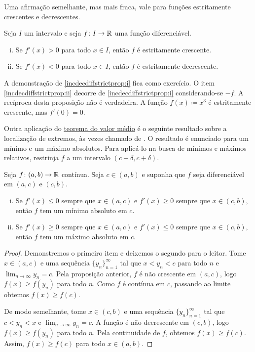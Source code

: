 Uma afirmação semelhante, mas mais fraca, vale para funções estritamente
crescentes e decrescentes.

\begin{prop} \label{incdecdiffstrictprop}
Seja $I$ um intervalo e
seja $f \colon I \to {\mathbb{R}}$ uma função diferenciável.
\begin{enumerate}[(i)]
\item
\label{incdecdiffstrictprop:i}
Se $f'(x) > 0$ para todo $x \in I$, então
$f$ é estritamente crescente.
\item
\label{incdecdiffstrictprop:ii}
Se $f'(x) < 0$ para todo $x \in I$,
então $f$ é estritamente decrescente.
\end{enumerate}
\end{prop}

A demonstração de
\ref{incdecdiffstrictprop:i}
fica como exercício.
O item \ref{incdecdiffstrictprop:ii}
decorre de
\ref{incdecdiffstrictprop:i} considerando-se $-f$.
A recíproca desta proposição não é verdadeira. A função
$f(x) \coloneqq x^3$ é estritamente crescente, mas $f'(0) = 0$.

\medskip

Outra aplicação do \hyperref[thm:mvt]{teorema do valor médio} é o seguinte
resultado sobre a localização de extremos, às vezes chamado de
\emph{}.
O resultado é enunciado para um mínimo e um máximo absolutos.
Para aplicá-lo na busca de mínimos e máximos relativos,
restrinja $f$ a um intervalo $(c-\delta,c+\delta)$.

\begin{prop} \label{firstderminmaxtest}
Seja $f \colon (a,b) \to {\mathbb{R}}$ contínua. Seja $c \in (a,b)$
e suponha que
$f$ seja diferenciável em $(a,c)$ e $(c,b)$.
\begin{enumerate}[(i)]
\item Se $f'(x) \leq 0$ sempre que $x \in (a,c)$ e
 $f'(x) \geq 0$ sempre que $x \in (c,b)$, então $f$ tem um mínimo absoluto
em $c$.
\item Se $f'(x) \geq 0$ sempre que $x \in (a,c)$ e
 $f'(x) \leq 0$ sempre que $x \in (c,b)$, então $f$ tem um máximo absoluto
em $c$.
\end{enumerate}
\end{prop}

\begin{proof}
Demonstremos o primeiro item e deixemos o segundo para o leitor.
Tome $x \in (a,c)$
e uma sequência $\{ y_n\}_{n=1}^\infty$ tal que $x < y_n < c$ para todo $n$
e $\lim_{n\to\infty} y_n = c$.
Pela proposição anterior,
$f$ é não crescente em $(a,c)$, logo $f(x) \geq f(y_n)$ para todo $n$.
Como $f$ é
contínua em $c$, passando ao limite obtemos
$f(x) \geq f(c)$.

De modo semelhante, tome $x \in (c,b)$
e uma sequência $\{ y_n\}_{n=1}^\infty$ tal que $c < y_n < x$ e
$\lim_{n\to\infty} y_n = c$.
A função é não decrescente em $(c,b)$, logo $f(x) \geq f(y_n)$ para todo $n$.
Pela continuidade de $f$, obtemos
$f(x) \geq f(c)$. Assim, $f(x) \geq f(c)$ para todo
$x \in (a,b)$.
\end{proof}

